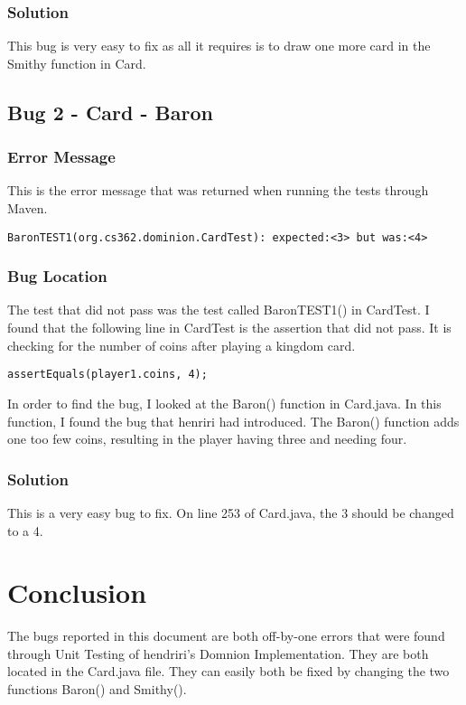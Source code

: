 \documentclass[letterpaper,10pt]{article}
\begin{document}
\subsubsection{Solution}
This bug is very easy to fix as all it requires is to draw one more card in the 
Smithy function in Card.

\subsection{Bug 2 - Card - Baron}
\subsubsection{Error Message}
This is the error message that was returned when running the tests through Maven.

\begin{lstlisting}
BaronTEST1(org.cs362.dominion.CardTest): expected:<3> but was:<4>
\end{lstlisting}

\subsubsection{Bug Location}
The test that did not pass was the test called BaronTEST1() in CardTest. I found that the following line in CardTest is the assertion that did not pass. It is checking for the number of coins after 
playing a kingdom card.

\begin{lstlisting}
assertEquals(player1.coins, 4);
\end{lstlisting}

In order to find the bug, I looked at the Baron() function in Card.java. In this function, I found the
 bug that henriri had introduced. The Baron() function adds one too few coins, resulting in the player
 having three and needing four.

\subsubsection{Solution}
This is a very easy bug to fix. On line 253 of Card.java, the 3 should be changed to a 4.

\section{Conclusion}
The bugs reported in this document are both off-by-one errors that were found through Unit Testing of 
hendriri's Domnion Implementation. They are both located in the Card.java file. They can easily both 
be fixed by changing the two functions Baron() and Smithy().
\end{document}
